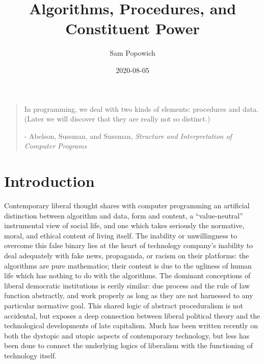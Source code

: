 \documentclass[12pt,oneside]{memoir}
\title{Algorithms, Procedures, and Constituent Power}
\author{Sam Popowich}
\date{2020-08-05}
\begin{document}
\maketitle


\setcounter{page}{1}

\mainmatter


\begin{quote}

In programming, we deal with two kinds of elements: procedures and data. (Later we will discover that they are really not so distinct.) 

- Abelson, Sussman, and Sussman, \emph{Structure and Interpretation of Computer Programs}

\end{quote}

\section*{Introduction}

Contemporary liberal thought shares with computer programming an artificial distinction between algorithm and data, form and content, a ``value-neutral'' instrumental view of social life, and one which takes seriously the normative, moral, and ethical content of living itself. The inability or unwillingness to overcome this false binary lies at the heart of technology company's inability to deal adequately with fake news, propaganda, or racism on their platforms: the algorithms are pure mathematics; their content is due to the ugliness of human life which has nothing to do with the algorithms. The dominant conceptions of liberal democratic institutions is eerily similar: due process and the rule of law function abstractly, and work properly as long as they are not harnessed to any particular normative goal. This shared logic of abstract proceduralism is not accidental, but exposes a deep connection between liberal political theory and the technological developments of late capitalism. Much has been written recently on both the dystopic and utopic aspects of contemporary technology, but less has been done to connect the underlying logics of liberalism with the functioning of technology itself.
\end{document}
